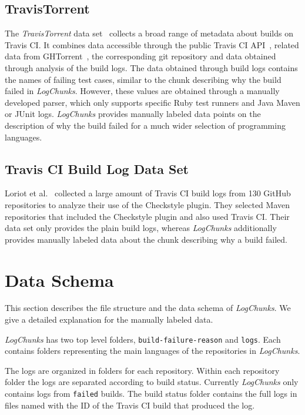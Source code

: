 \documentclass[\myrootdir/main.tex]{subfiles}
\begin{document}
\subsection{TravisTorrent}
The \emph{TravisTorrent} data set~\cite{beller2017travistorrent} collects a broad range of metadata about builds on Travis CI\@.
It combines data accessible through the public Travis CI API~\cite{travisci2019apidoc}, related data from GHTorrent~\cite{gousios2013ghtorrent}, the corresponding git repository and data obtained through analysis of the build logs.
The data obtained through build logs contains the names of failing test cases, similar to the chunk describing why the build failed in \emph{LogChunks}.
However, these values are obtained through a manually developed parser, which only supports specific Ruby test runners and Java Maven or JUnit logs.
\emph{LogChunks} provides manually labeled data points on the description of why the build failed for a much wider selection of programming languages.

\subsection{Travis CI Build Log Data Set}
Loriot et al.~\cite{loriot2019dataset, loriot2019styler} collected a large amount of Travis CI build logs from 130 GitHub repositories to analyze their use of the Checkstyle plugin.
They selected Maven repositories that included the Checkstyle plugin and also used Travis CI\@.
Their data set only provides the plain build logs, whereas \emph{LogChunks} additionally provides manually labeled data about the chunk describing why a build failed.

\section{Data Schema}
\label{sec:data-schema}
This section describes the file structure and the data schema of \emph{LogChunks}.
We give a detailed explanation for the manually labeled data.

\emph{LogChunks} has two top level folders, \texttt{build-failure-reason} and \texttt{logs}.
Each contains folders representing the main languages of the repositories in \emph{LogChunks}.

The logs are organized in folders for each repository.
Within each repository folder the logs are separated according to build status.
Currently \emph{LogChunks} only contains logs from \texttt{failed} builds.
The build status folder contains the full logs in files named with the ID of the Travis CI build that produced the log.
\end{document}
